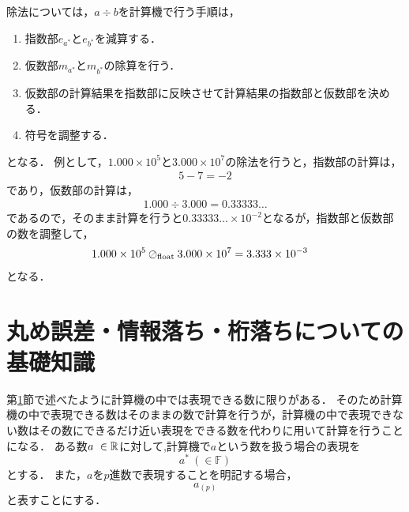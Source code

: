除法については，$a \div b$を計算機で行う手順は，
\begin{enumerate}
    \item 指数部$e_{a^{\ast}}$と$e_{b^{\ast}}$を減算する．
    \item 仮数部$m_{a^{\ast}}$と$m_{b^{\ast}}$の除算を行う．
    \item 仮数部の計算結果を指数部に反映させて計算結果の指数部と仮数部を決める．
    \item 符号を調整する．
\end{enumerate}
となる．
例として，$1.000 \times 10^5$と$3.000 \times 10^7$の除法を行うと，指数部の計算は，
\begin{align*}
    5 - 7 = -2
\end{align*}
であり，仮数部の計算は，
\begin{align*}
    1.000 \div 3.000 = 0.33333\dots
\end{align*}
であるので，そのまま計算を行うと$0.33333\dots \times 10^{-2}$となるが，指数部と仮数部の数を調整して，
\begin{align*}
    1.000 \times 10^5 \oslash_{\mathrm{float}} 3.000 \times 10^7 &= 3.333 \times 10^{-3}
\end{align*}
となる．

\section{丸め誤差・情報落ち・桁落ちについての基礎知識}
第\ref{}節で述べたように計算機の中では表現できる数に限りがある．
そのため計算機の中で表現できる数はそのままの数で計算を行うが，計算機の中で表現できない数はその数にできるだけ近い表現をできる数を代わりに用いて計算を行うことになる．
ある数$a\ \in \mathbb{R}$に対して,計算機で$a$という数を扱う場合の表現を
\begin{equation*}    
    a^{\ast} \ (\in \mathbb{F})
\end{equation*}
とする．
また，$a$を$p$進数で表現することを明記する場合，
\begin{equation*}
    a_{(p)}
\end{equation*}
と表すことにする．
\label{chap:基礎知識2}

